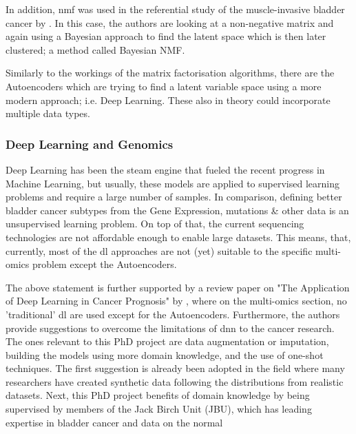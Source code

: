 In addition, \acrfull{nmf} was used in the referential study of the muscle-invasive bladder cancer by \citet{Robertson2017-mg}. In this case, the authors are looking at a non-negative matrix and again using a Bayesian approach to find the latent space which is then later clustered; a method called Bayesian NMF.

Similarly to the workings of the matrix factorisation algorithms, there are the Autoencoders which are trying to find a latent variable space using a more modern approach; i.e. Deep Learning. These also in theory could incorporate multiple data types.

\subsubsection{Deep Learning  and Genomics} \label{s:lit:dl_genomics}

\vspace{3mm}
\vspace{3mm}

Deep Learning has been the steam engine that fueled the recent progress in Machine Learning, but usually, these models are applied to supervised learning problems and require a large number of samples. In comparison, defining better bladder cancer subtypes from the Gene Expression, mutations \& other data is an unsupervised learning problem. On top of that, the current sequencing technologies are not affordable enough to enable large datasets. This means, that, currently, most of the \acrshort{dl} approaches are not (yet) suitable to the specific multi-omics problem except the Autoencoders.

The above statement is further supported by a review paper on "The Application of Deep Learning in Cancer Prognosis" by \citet{Zhu2020-cv}, where on the multi-omics section, no 'traditional' \acrshort{dl} are used except for the Autoencoders. Furthermore, the authors provide suggestions to overcome the limitations of \acrshort{dnn} to the cancer research. The ones relevant to this PhD project are data augmentation or imputation, building the models using more domain knowledge, and the use of one-shot techniques. The first suggestion is already been adopted in the field where many researchers have created synthetic data \cite{Zhao2012-wj,Leiserson2015-yk} following the distributions from realistic datasets. Next, this PhD project benefits of domain knowledge by being supervised by members of the Jack Birch Unit (JBU), which has leading expertise in bladder cancer and data on the normal

